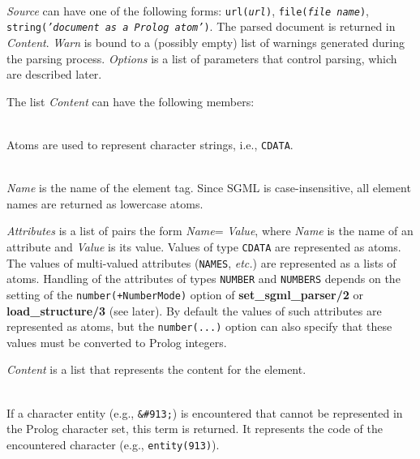\begin{description}
\item[{\bf load\_structure}{\bf (}{\it +Source, -Content, +Options, -Warn}{\bf )}]\mbox{}
  \\
  {\it Source} can have one of the following forms:
   {\tt url({\it {url}})}, {\tt file({\it file name})},
  {\tt string({\it 'document as a Prolog atom'})}.
  The parsed document is returned in {\it Content}.
  {\it Warn} is bound to a (possibly empty) list of warnings generated
  during the parsing process.
  {\it Options} is a list of parameters that control parsing, which are
  described later.

  The list {\it Content}  can have the following members:
  \begin{description}
  \item[A Prolog atom]\mbox{}\\
    Atoms are used to represent character strings, i.e., {\tt CDATA}. 

  \item[{\bf element}{\bf (}{\it Name, Attributes, Content}{\bf
    )}]\mbox{}\\{\it Name} is the name of the element tag. Since SGML is 
    case-insensitive, all element names are returned as lowercase atoms.
    
    {\it Attributes} is a list of pairs the form {\it Name}={\it
      Value}, where \emph{Name} is the name of an attribute and
    \emph{Value} is its value.  Values of type {\tt CDATA} are represented
    as atoms. The values of multi-valued attributes ({\tt NAMES},
    \emph{etc.}) are represented as a lists of atoms.  Handling of the
    attributes of types {\tt NUMBER} and {\tt NUMBERS} depends on the
    setting of the {\tt number(+NumberMode)} option of {\bf
      set\_sgml\_parser/2} or {\bf load\_structure/3} (see later).  By
    default the values of such attributes
    are represented as atoms, but the {\tt number(...)} option can also 
    specify that these values must be converted to
    Prolog integers.
    
    {\it Content} is a list that represents
    the content for the element.

  \item[{\bf entity}{\bf (}{\it Code}{\bf )}]\mbox{}\\
    If a character entity (e.g., \verb$&#913;$) is encountered that 
    cannot be represented in the Prolog character set, this term is 
    returned. It represents the code of the encountered character (e.g.,
    {\tt entity(913)}).


\end{description}
\end{description}
